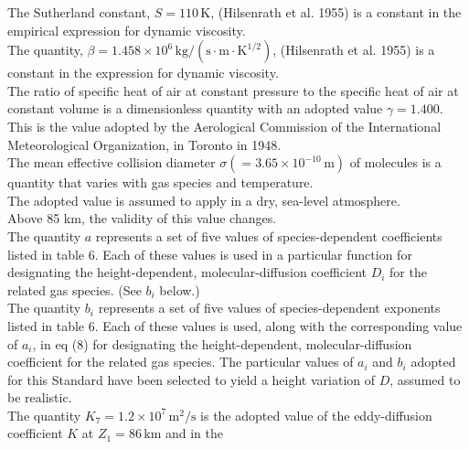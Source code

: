 \documentclass{article}
\begin{document}
The Sutherland constant, $S = 110 \, \mathrm{K}$, (Hilsenrath et al. 1955) is a constant in the empirical expression for dynamic viscosity.\\

The quantity, $\beta = 1.458 \times 10^{6} \, \mathrm{kg/(s \cdot m \cdot K^{1/2})}$, (Hilsenrath et al. 1955) is a constant in the expression for dynamic viscosity.\\

The ratio of specific heat of air at constant pressure to the specific heat of air at constant volume is a dimensionless quantity with an adopted value $\gamma = 1.400$.\\
This is the value adopted by the Aerological Commission of the International Meteorological Organization, in Toronto in 1948.\\

The mean effective collision diameter $\sigma (= 3.65 \times 10^{-10} \, \mathrm{m})$ of molecules is a quantity that varies with gas species and temperature.\\
The adopted value is assumed to apply in a dry, sea-level atmosphere.\\
Above 85 km, the validity of this value changes.\\
\noindent The quantity $a$ represents a set of five values of species-dependent coefficients listed in table 6. Each of these values is used in a particular function for designating the height-dependent, molecular-diffusion coefficient $D_i$ for the related gas species. (See $b_i$ below.)\\
\noindent The quantity $b_i$ represents a set of five values of species-dependent exponents listed in table 6. Each of these values is used, along with the corresponding value of $a_i$, in eq (8) for designating the height-dependent, molecular-diffusion coefficient for the related gas species. The particular values of $a_i$ and $b_i$ adopted for this Standard have been selected to yield a height variation of $D$, assumed to be realistic.\\
The quantity $K_7 = 1.2 \times 10^7 \, \mathrm{m^2/s}$ is the adopted value of the eddy-diffusion coefficient $K$ at $Z_1 = 86 \, \mathrm{km}$ and in the
\end{document}
